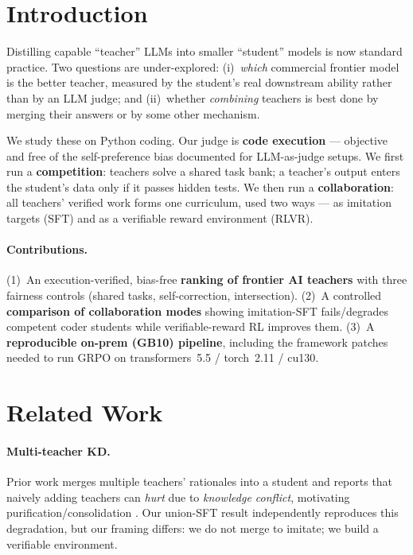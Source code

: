 \documentclass[11pt]{article}
\begin{document}
\section{Introduction}
Distilling capable ``teacher'' LLMs into smaller ``student'' models is now standard practice.
Two questions are under-explored: (i)~\emph{which} commercial frontier model is the better
teacher, measured by the student's real downstream ability rather than by an LLM judge; and
(ii)~whether \emph{combining} teachers is best done by merging their answers or by some other
mechanism.

We study these on Python coding. Our judge is \textbf{code execution} --- objective and free
of the self-preference bias documented for LLM-as-judge setups. We first run a
\textbf{competition}: teachers solve a shared task bank; a teacher's output enters the
student's data only if it passes hidden tests. We then run a \textbf{collaboration}: all
teachers' verified work forms one curriculum, used two ways --- as imitation targets (SFT)
and as a verifiable reward environment (RLVR).

\paragraph{Contributions.}
(1)~An execution-verified, bias-free \textbf{ranking of frontier AI teachers} with three
fairness controls (shared tasks, self-correction, intersection). (2)~A controlled
\textbf{comparison of collaboration modes} showing imitation-SFT fails/degrades competent
coder students while verifiable-reward RL improves them. (3)~A \textbf{reproducible on-prem
(GB10) pipeline}, including the framework patches needed to run GRPO on transformers~5.5 /
torch~2.11 / cu130.

\section{Related Work}
\paragraph{Multi-teacher KD.}
Prior work merges multiple teachers' rationales into a student and reports that naively adding
teachers can \emph{hurt} due to \emph{knowledge conflict}, motivating purification/consolidation
\citep{multiteacherkd}. Our union-SFT result independently reproduces this degradation, but our
framing differs: we do not merge to imitate; we build a verifiable environment.
\end{document}
